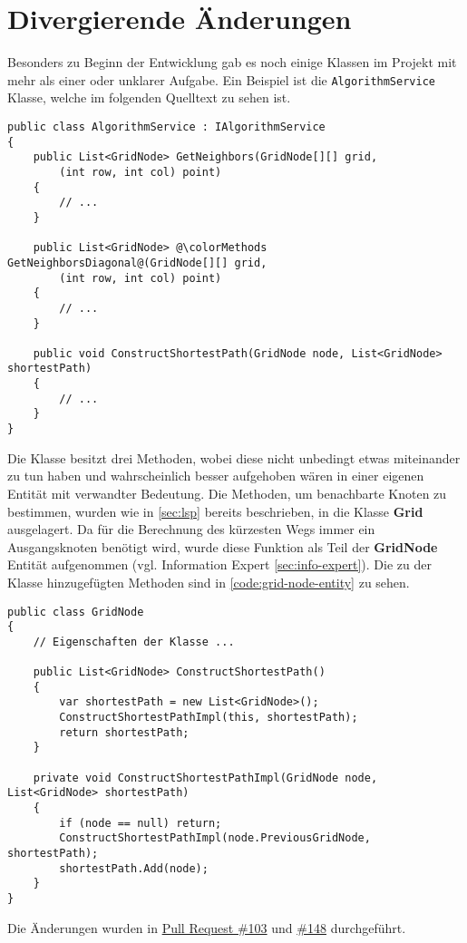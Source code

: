 \section{Divergierende Änderungen}
Besonders zu Beginn der Entwicklung gab es noch einige Klassen
im Projekt mit mehr als einer oder unklarer Aufgabe.
Ein Beispiel ist die \lstinline{AlgorithmService} Klasse,
welche im folgenden Quelltext zu sehen ist.
\newpage
\begin{lstlisting}[caption={{\lstinline{AlgorithmService}} Klasse},
    label={code:alg-service}]
public class AlgorithmService : IAlgorithmService
{
    public List<GridNode> GetNeighbors(GridNode[][] grid,
        (int row, int col) point)
    {
        // ...
    }

    public List<GridNode> @\colorMethods GetNeighborsDiagonal@(GridNode[][] grid,
        (int row, int col) point)
    {
        // ...
    }

    public void ConstructShortestPath(GridNode node, List<GridNode> shortestPath)
    {
        // ...
    }
}
\end{lstlisting}
Die Klasse besitzt drei Methoden, wobei diese nicht unbedingt etwas miteinander
zu tun haben und wahrscheinlich besser aufgehoben
wären in einer eigenen Entität mit verwandter Bedeutung. Die Methoden,
um benachbarte Knoten zu bestimmen, wurden wie in \ref{sec:lsp}
bereits beschrieben, in die Klasse \textbf{Grid} ausgelagert.
Da für die Berechnung des kürzesten Wegs immer ein Ausgangsknoten benötigt wird, wurde diese
Funktion als Teil der \textbf{GridNode}
Entität aufgenommen (vgl. Information Expert \ref{sec:info-expert}).
Die zu der Klasse hinzugefügten Methoden sind in \autoref{code:grid-node-entity} zu sehen.
\newpage
\begin{lstlisting}[caption={\textbf{GridNode} Entität}, label={code:grid-node-entity}]
public class GridNode
{
    // Eigenschaften der Klasse ...

    public List<GridNode> ConstructShortestPath()
    {
        var shortestPath = new List<GridNode>();
        ConstructShortestPathImpl(this, shortestPath);
        return shortestPath;
    }

    private void ConstructShortestPathImpl(GridNode node, List<GridNode> shortestPath)
    {
        if (node == null) return;
        ConstructShortestPathImpl(node.PreviousGridNode, shortestPath);
        shortestPath.Add(node);
    }
}
\end{lstlisting}
Die Änderungen wurden in
\href{https://github.com/JensDll/pathfinding-visualization/pull/103}{Pull Request \#103}
und \href{https://github.com/JensDll/pathfinding-visualization/pull/148}{\#148}
durchgeführt.